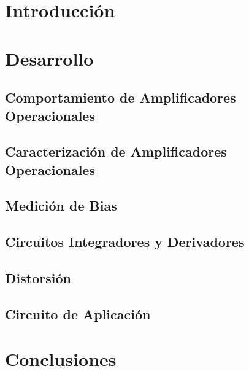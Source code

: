 







\section{Introducción}

\section{Desarrollo}

\subsection{Comportamiento de Amplificadores Operacionales}

	

\subsection{Caracterización de Amplificadores Operacionales}

	

\subsection{Medición de Bias}

	

\subsection{Circuitos Integradores y Derivadores}

	

\subsection{Distorsión}

	

\subsection{Circuito de Aplicación}

	

\section{Conclusiones}


